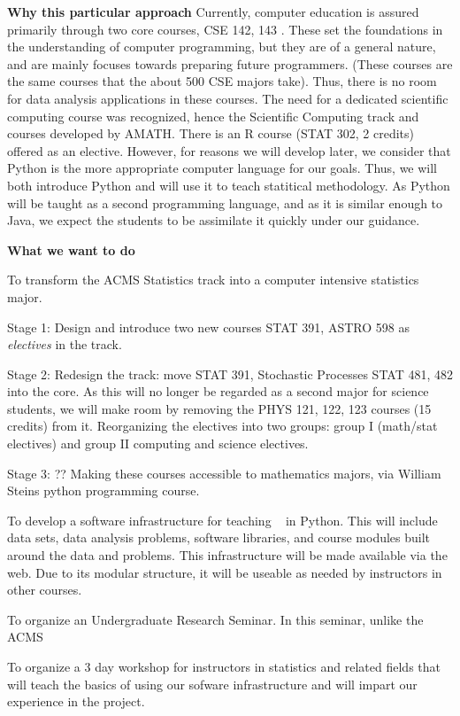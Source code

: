 {\bf Why this particular approach} Currently, computer education is
assured primarily through two core courses, CSE 142, 143
\cite{cse142}. These set the foundations in the understanding of
computer programming, but they are of a general nature, and are mainly
focuses towards preparing future programmers. (These courses are the
same courses that the about 500 CSE majors take). Thus, there is no
room for data analysis applications in these courses. The need for a
dedicated scientific computing course was recognized, hence the
Scientific Computing track and courses developed by AMATH. There is an
R course (STAT 302, 2 credits) offered as an elective. However, for
reasons we will develop later, we consider that Python is the more
appropriate computer language for our goals. Thus, we will both
introduce Python and will use it to teach statitical methodology. As
Python will be taught as a second programming language, and as it is
similar enough to Java, we expect the students to be assimilate it
quickly under our guidance. 


{\bf What we want to do}

\bit
\item To transform the ACMS Statistics track into a computer intensive statistics major. 
  \bit
   \item Stage 1: Design and introduce two new courses STAT 391, ASTRO 598 as {\em electives} in the track.
   \item Stage 2: Redesign the track: move STAT 391, Stochastic Processes STAT 481, 482 into the core. As this will no longer be regarded as a second major for science students, we will make room by removing the PHYS 121, 122, 123 courses (15 credits) from it. Reorganizing the electives into two groups: group I (math/stat electives) and group II computing and science electives. 
   \item Stage 3: ?? Making these courses accessible to mathematics majors, via William Steins python programming course. 
  \eit
\item To develop a software infrastructure for teaching \cdse~ in
  Python. This will include data sets, data analysis problems,
  software libraries, and course modules built around the data and
  problems. This infrastructure will be made available via the
  web. Due to its modular structure, it will be useable as needed by
  instructors in other courses.
\item To organize an Undergraduate Research Seminar. In this seminar, unlike the ACMS 
\item To organize a 3 day workshop for instructors in statistics and related fields that will teach the basics of using our sofware infrastructure and will impart our experience in the project.
\eit



